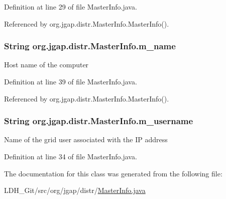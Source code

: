 Definition at line 29 of file Master\-Info.\-java.



Referenced by org.\-jgap.\-distr.\-Master\-Info.\-Master\-Info().

\hypertarget{classorg_1_1jgap_1_1distr_1_1_master_info_ad36b22cc9f6de77bf9e14a150234db56}{
\subsubsection[{m\-\_\-name}]{\setlength{\rightskip}{0pt plus 5cm}String org.\-jgap.\-distr.\-Master\-Info.\-m\-\_\-name}}\label{classorg_1_1jgap_1_1distr_1_1_master_info_ad36b22cc9f6de77bf9e14a150234db56}
Host name of the computer 

Definition at line 39 of file Master\-Info.\-java.



Referenced by org.\-jgap.\-distr.\-Master\-Info.\-Master\-Info().

\hypertarget{classorg_1_1jgap_1_1distr_1_1_master_info_adfc76742a11e2bb2d7a26bacd45ca011}{
\subsubsection[{m\-\_\-username}]{\setlength{\rightskip}{0pt plus 5cm}String org.\-jgap.\-distr.\-Master\-Info.\-m\-\_\-username}}\label{classorg_1_1jgap_1_1distr_1_1_master_info_adfc76742a11e2bb2d7a26bacd45ca011}
Name of the grid user associated with the I\-P address 

Definition at line 34 of file Master\-Info.\-java.



The documentation for this class was generated from the following file\-:\begin{DoxyCompactItemize}
\item 
L\-D\-H\-\_\-\-Git/src/org/jgap/distr/\hyperlink{_master_info_8java}{Master\-Info.\-java}\end{DoxyCompactItemize}
